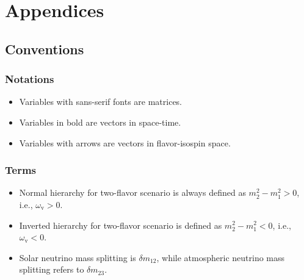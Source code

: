 


\part*{Appendices}
\label{chap:appendices}

\appendix



\chapter{\label{chap:app-sec:conventions}Conventions}

\section{\label{part:app-chap:conventions-sec:notations}Notations}

\begin{itemize}
  \item Variables with sans-serif fonts are matrices.
  \item Variables in bold are vectors in space-time.
  \item Variables with arrows are vectors in flavor-isospin space.
\end{itemize}

\section{\label{chap:app-sec:conventions-subsec:terms}Terms}

\begin{itemize}
    \item
    Normal hierarchy for two-flavor scenario is always defined as $m_2^2-m_1^2>0$, i.e., $\omega_{\mathrm v}>0$.
    \item
    Inverted hierarchy for two-flavor scenario is defined as $m_2^2-m_1^2<0$, i.e., $\omega_{\mathrm v}<0$.
    \item
    Solar neutrino mass splitting is $\delta m_{12}$, while atmospheric neutrino mass splitting refers to $\delta m_{23}$.
\end{itemize}





